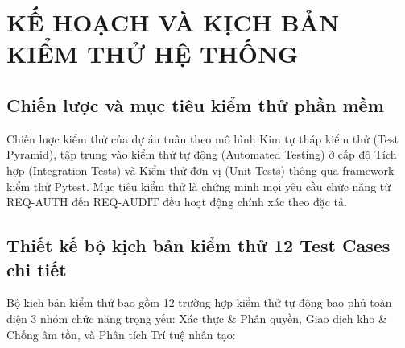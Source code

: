 \chapter{KẾ HOẠCH VÀ KỊCH BẢN KIỂM THỬ HỆ THỐNG}

\section{Chiến lược và mục tiêu kiểm thử phần mềm}

Chiến lược kiểm thử của dự án tuân theo mô hình Kim tự tháp kiểm thử (Test Pyramid), tập trung vào kiểm thử tự động (Automated Testing) ở cấp độ Tích hợp (Integration Tests) và Kiểm thử đơn vị (Unit Tests) thông qua framework kiểm thử Pytest. Mục tiêu kiểm thử là chứng minh mọi yêu cầu chức năng từ REQ-AUTH đến REQ-AUDIT đều hoạt động chính xác theo đặc tả.

\section{Thiết kế bộ kịch bản kiểm thử 12 Test Cases chi tiết}

Bộ kịch bản kiểm thử bao gồm 12 trường hợp kiểm thử tự động bao phủ toàn diện 3 nhóm chức năng trọng yếu: Xác thực \& Phân quyền, Giao dịch kho \& Chống âm tồn, và Phân tích Trí tuệ nhân tạo:

